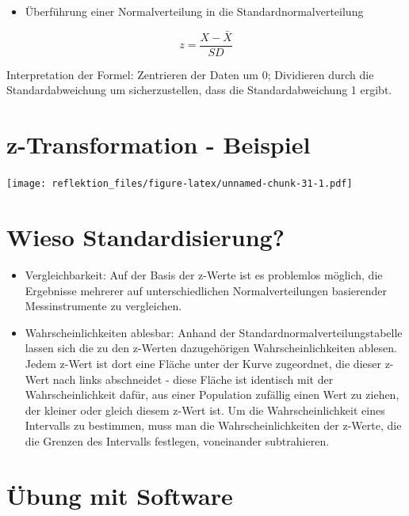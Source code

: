 \documentclass[
]{book}
\providecommand{\tightlist}{%
  \setlength{\itemsep}{0pt}\setlength{\parskip}{0pt}}
\begin{document}
\begin{itemize}
\tightlist
\item
  Überführung einer Normalverteilung in die Standardnormalverteilung
\end{itemize}

\[ z = \frac{X - \bar{X}}{SD} \]

Interpretation der Formel: Zentrieren der Daten um 0; Dividieren durch die Standardabweichung um sicherzustellen, dass die Standardabweichung 1 ergibt.

\hypertarget{z-transformation---beispiel}{%
\section{z-Transformation - Beispiel}\label{z-transformation---beispiel}}

\texttt{[image: reflektion\_files/figure-latex/unnamed-chunk-31-1.pdf]}

\hypertarget{wieso-standardisierung}{%
\section{Wieso Standardisierung?}\label{wieso-standardisierung}}

\begin{itemize}
\tightlist
\item
  Vergleichbarkeit: Auf der Basis der z-Werte ist es problemlos möglich, die Ergebnisse mehrerer auf unterschiedlichen Normalverteilungen basierender Messinstrumente zu vergleichen.
\item
  Wahrscheinlichkeiten ablesbar: Anhand der Standardnormalverteilungstabelle lassen sich die zu den z-Werten dazugehörigen Wahrscheinlichkeiten ablesen. Jedem z-Wert ist dort eine Fläche unter der Kurve zugeordnet, die dieser z-Wert nach links abschneidet - diese Fläche ist identisch mit der Wahrscheinlichkeit dafür, aus einer Population zufällig einen Wert zu ziehen, der kleiner oder gleich diesem z-Wert ist. Um die Wahrscheinlichkeit eines Intervalls zu bestimmen, muss man die Wahrscheinlichkeiten der z-Werte, die die Grenzen des Intervalls festlegen, voneinander subtrahieren.
\end{itemize}

\hypertarget{uxfcbung-mit-software}{%
\section{Übung mit Software}\label{uxfcbung-mit-software}}
\end{document}
